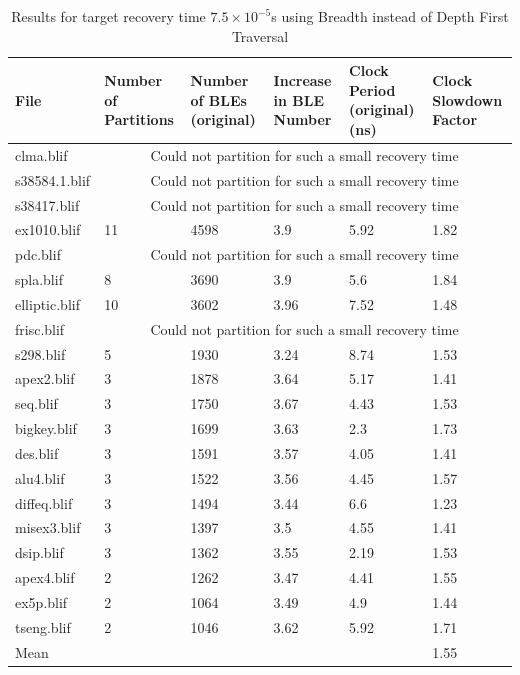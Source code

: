 \documentclass[12pt,final,oneside]{dwThesis} %
\begin{document}
         \begin{table}
      \footnotesize
      \begin{adjustwidth}{-1cm}{-1.2cm}
         \begin{tabularx}{1.1\textwidth}{XXXXXX}
            \toprule
            File & Number of Partitions &  Number of BLEs (original) &  Increase in BLE Number &  Clock Period (original) (ns) &  Clock Slowdown Factor\\
            \midrule

   clma.blif      & \multicolumn{5}{c}{Could not partition for such a small recovery time}\\
s38584.1.blif  &  \multicolumn{5}{c}{Could not partition for such a small recovery time}\\
s38417.blif    &  \multicolumn{5}{c}{Could not partition for such a small recovery time}\\
ex1010.blif    & 11 & 4598 & 3.9 & 5.92 & 1.82\\
pdc.blif       &   \multicolumn{5}{c}{Could not partition for such a small recovery time}\\
spla.blif      & 8 & 3690 & 3.9 & 5.6 & 1.84\\
elliptic.blif  & 10 & 3602 & 3.96 & 7.52 & 1.48\\
frisc.blif     &   \multicolumn{5}{c}{Could not partition for such a small recovery time}\\
s298.blif      & 5 & 1930 & 3.24 & 8.74 & 1.53\\
apex2.blif     & 3 & 1878 & 3.64 & 5.17 & 1.41\\
seq.blif       & 3 & 1750 & 3.67 & 4.43 & 1.53\\
bigkey.blif    & 3 & 1699 & 3.63 & 2.3 & 1.73\\
des.blif       & 3 & 1591 & 3.57 & 4.05 & 1.41\\
alu4.blif      & 3 & 1522 & 3.56 & 4.45 & 1.57\\
diffeq.blif    & 3 & 1494 & 3.44 & 6.6 & 1.23\\
misex3.blif    & 3 & 1397 & 3.5 & 4.55 & 1.41\\
dsip.blif      & 3 & 1362 & 3.55 & 2.19 & 1.53\\
apex4.blif     & 2 & 1262 & 3.47 & 4.41 & 1.55\\
ex5p.blif      & 2 & 1064 & 3.49 & 4.9 & 1.44\\
tseng.blif     & 2 & 1046 & 3.62 & 5.92 & 1.71\\
Mean    &  &  &  & &1.55\\
\bottomrule
         \end{tabularx}
         \caption{Results for target recovery time $7.5\times10^{-5}$s using Breadth instead of Depth First Traversal}
         \label{Results7.5e-5DFS}
      \end{adjustwidth}
   \end{table}
   
   
   
\end{document}
